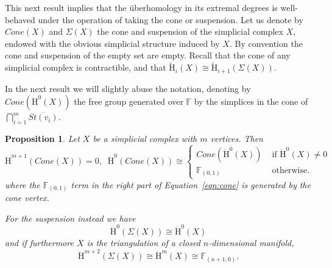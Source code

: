 \documentclass[11pt, a4paper, reqno, twoside, makeidx]{amsart}
\theoremstyle{remark}
\theoremstyle{plain}
\newtheorem{prop}[thm]{Proposition}
\theoremstyle{definition}
\newcommand{\F}{\mathbb{F}}
\newcommand{\HH}{\mathrm{H}}
\newcommand{\uH}{\ddot{\mathrm{H}}}
\begin{document}
This next result implies that the \"uberhomology in its extremal degrees is well-behaved under the operation of taking the cone or suspension.
Let us denote by $Cone(X)$ and $\Sigma(X)$ the cone and suspension of the simplicial complex $X$, endowed with the obvious simplicial structure induced by $X$. By convention the cone and suspension of the empty set are empty. Recall that the cone of any simplicial complex is contractible, and that $\widetilde{\HH}_i(X) \cong \widetilde{\HH}_{i+1}(\Sigma (X))$. 

In the next result we will slightly abuse the notation, denoting by $Cone(\uH^0(X))$ the free group generated over $\F$ by the simplices in the cone of $\bigcap_{i=1}^m \overline{St(v_i)}$.

\begin{prop}\label{prop:cone}
Let $X$ be a simplicial complex with $m$ vertices. Then 
\begin{equation}\label{eqn:cone}
\uH^{m+1}(Cone(X)) = 0, \;\; \uH^0(Cone(X)) \cong 
\begin{cases}
Cone(\uH^0(X)) & \text{ if } \uH^0(X) \neq 0\\
\F_{(0,1)} & \text{ otherwise.}
\end{cases}
\end{equation}
where the $\F_{(0,1)}$ term in the right part of Equation~\eqref{eqn:cone} is generated by the cone vertex.

For the suspension instead we have 
\begin{equation}\label{eqn:suspension}
\uH^0(\Sigma(X)) \cong \uH^0(X)
\end{equation}
and if furthermore $X$ is the triangulation of a closed $n$-dimensional manifold,
\begin{equation}
\uH^{m+2}(\Sigma(X)) \cong \uH^{m}(X)  \cong \F_{(n+1,0)}.
\end{equation}
\end{prop}
\end{document}
